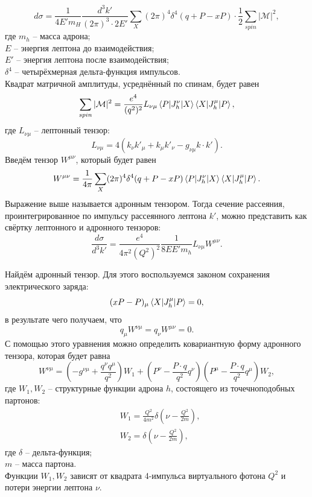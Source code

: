 \documentclass{extreport}
\begin{document}
\begin{equation}
	d\sigma = \frac{1}{4E' m_H} \frac{d^3k'}{(2\pi)^3 \cdot 2E'} \sum_X (2\pi)^4 \delta^4(q+P-xP) \cdot \frac{1}{2} \sum_{spin} |\mathcal{M}|^2,
\end{equation}
где $m_h$ -- масса адрона; \\ $E$ -- энергия лептона до взаимодействия; \\ $E'$ -- энергия лептона после взаимодействия; \\  $\delta^4$ -- четырёхмерная дельта-функция импульсов. \\
Квадрат матричной амплитуды, усреднённый по спинам, будет равен
\begin{equation}
	\sum_{spin} |\mathcal{M}|^2 = \frac{e^4}{(q^2)^2}L_{\nu \mu}\braket{P | J_h^\nu | X} \braket{X | J_h^\mu | P}, 
	\label{eq:lepton}
\end{equation}
где $L_{\nu\mu}$ -- лептонный тензор:
\begin{equation}
	L_{\nu\mu} = 4 (k_\nu k'_\mu + k_\mu k'_\nu - g_{\nu\mu}k\cdot k').
\end{equation}
Введём тензор $W^{\mu\nu}$, который будет равен
\begin{equation}
	W^{\mu\nu} = \frac{1}{4\pi} \sum_X (2\pi)^4 \delta^4(q+P-xP) \braket{P | J_h^\nu | X} \braket{X | J_h^\mu | P}.
\end{equation}
Выражение выше называется адронным тензором. Тогда сечение рассеяния, проинтегрированное по импульсу рассеянного лептона $k'$, можно представить как свёртку лептонного и адронного тензоров:
\begin{equation}
	\frac{d\sigma}{d^3 k'} = \frac{e^4}{4\pi^2(Q^2)^2} \frac{1}{8EE'm_h}L_{\nu\mu}W^{\mu\nu}.
\end{equation}

Найдём адронный тензор. Для этого воспользуемся законом сохранения электрического заряда:
\begin{equation}
	(xP-P)_\mu \braket{X | J_h^\mu | P} = 0,
\end{equation}
в результате чего получаем, что 
\begin{equation}
	q_\mu W^{\nu \mu} = q_\nu W^{\mu \nu} = 0. 
\end{equation}
С помощью этого уравнения можно определить ковариантную форму адронного тензора, которая будет равна
\begin{equation}
	W^{\nu \mu} = (-g^{\nu\mu}+ \frac{q^\nu q^\mu}{q^2})W_1 + (P^\nu - \frac{P\cdot q}{q^2}q^\nu)(P^\mu - \frac{P\cdot q}{q^2} q^\mu) W_2,
\end{equation}
где $W_1, W_2$ -- структурные функции адрона $h$, состоящего из точечноподобных партонов:
\begin{equation}
\begin{split}
	& W_1  =   \frac{Q^2}{4m^2} \delta(\nu - \frac{Q^2}{2m}), \\
	& W_2  =  \delta(\nu - \frac{Q^2}{2m}),
\end{split}
	\label{eq:deltastruct}
\end{equation}
где $\delta$ -- дельта-функция; \\ $m$ -- масса партона. \\ Функции $W_1, W_2$ зависят от квадрата 4-импульса виртуального фотона $Q^2$ и потери энергии лептона $\nu$.
\end{document}

